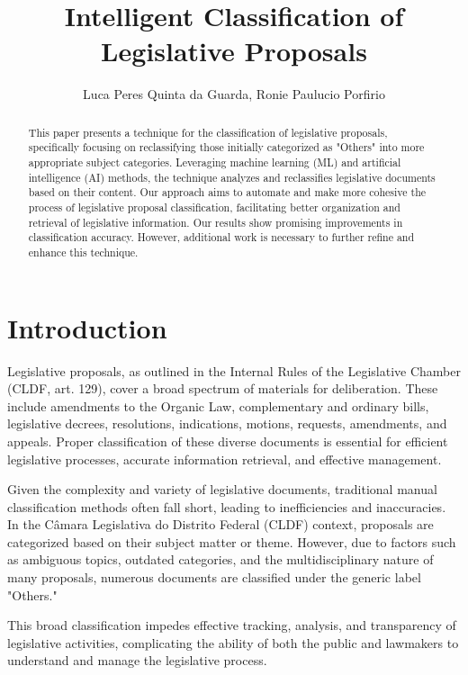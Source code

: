 \documentclass[12pt]{article}
\title{Intelligent Classification of Legislative Proposals}
\author{Luca Peres Quinta da Guarda\inst{1}, Ronie Paulucio Porfirio\inst{1}}
\begin{document}
 
	
	\maketitle
	
\begin{abstract}
	This paper presents a technique for the classification of legislative proposals, specifically focusing on reclassifying those initially categorized as "Others" into more appropriate subject categories. Leveraging machine learning (ML) and artificial intelligence (AI) methods, the technique analyzes and reclassifies legislative documents based on their content. Our approach aims to automate and make more cohesive the process of legislative proposal classification, facilitating better organization and retrieval of legislative information. Our results show promising improvements in classification accuracy. However, additional work is necessary to further refine and enhance this technique.
\end{abstract}

\section{Introduction}

Legislative proposals, as outlined in the Internal Rules of the Legislative Chamber (CLDF, art. 129), cover a broad spectrum of materials for deliberation. These include amendments to the Organic Law, complementary and ordinary bills, legislative decrees, resolutions, indications, motions, requests, amendments, and appeals. Proper classification of these diverse documents is essential for efficient legislative processes, accurate information retrieval, and effective management.

Given the complexity and variety of legislative documents, traditional manual classification methods often fall short, leading to inefficiencies and inaccuracies. In the Câmara Legislativa do Distrito Federal (CLDF) context, proposals are categorized based on their subject matter or theme. However, due to factors such as ambiguous topics, outdated categories, and the multidisciplinary nature of many proposals, numerous documents are classified under the generic label "Others."

This broad classification impedes effective tracking, analysis, and transparency of legislative activities, complicating the ability of both the public and lawmakers to understand and manage the legislative process.
\end{document}
